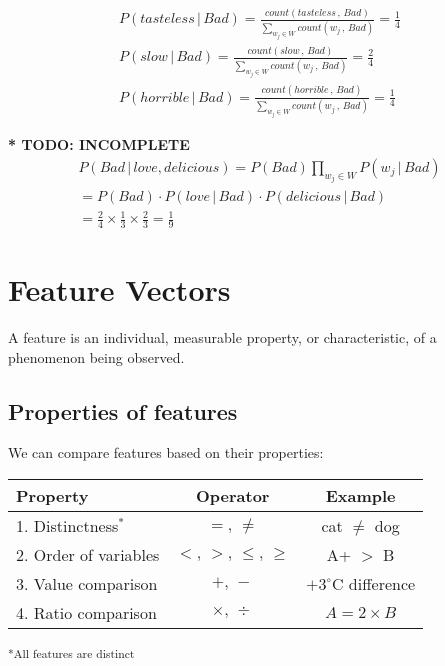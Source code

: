 \documentclass[9pt,twocolumn]{article}
\begin{document}
\begin{equation}
\begin{split}
P(tasteless\,|\,Bad) = \frac{count(tasteless\,,\,Bad)}{\sum_{w_j\in W}count(w_j\,,\,Bad)} = \frac{1}{4}\\
P(slow\,|\,Bad) = \frac{count(slow\,,\,Bad)}{\sum_{w_j\in W}count(w_j\,,\,Bad)} = \frac{2}{4}\\
P(horrible\,|\,Bad) = \frac{count(horrible\,,\,Bad)}{\sum_{w_j\in W}count(w_j\,,\,Bad)} = \frac{1}{4}
\end{split}
\end{equation}

\textbf{* TODO: INCOMPLETE}
\begin{equation}
\begin{split}
P(Bad\,|\,{love, delicious}) = P(Bad)\prod_{w_j\in W}P(w_j\,|\,Bad)\\
= P(Bad)\cdot P(love\,|\,Bad)\cdot P(delicious\,|\,Bad)\\
= \frac{2}{4}\times\frac{1}{3}\times\frac{2}{3} = \frac{1}{9}
\end{split}
\end{equation}

\section{Feature Vectors}
A feature is an individual, measurable property, or characteristic, of a phenomenon being observed.

	\subsection*{Properties of features}
		We can compare features based on their properties:
		\begin{center}
		\begin{tabular}{|l|c|c|} 
		\hline
		Property & Operator & Example\\
		\hline
		1. Distinctness$^*$& $=,\,\neq$ & cat $\neq$ dog\\
		2. Order of variables& $<,\,>,\,\leq,\,\geq$ & A+ $>$ B\\
		3. Value comparison & $+,\,-$ & $+3^{\circ}\mathrm{C}$ difference\\
		4. Ratio comparison & $\times,\,\div $ & $A = 2\times B$ \\
		\hline
		\end{tabular}
		\end{center}
		\textsuperscript{*All features are distinct}
\end{document}
